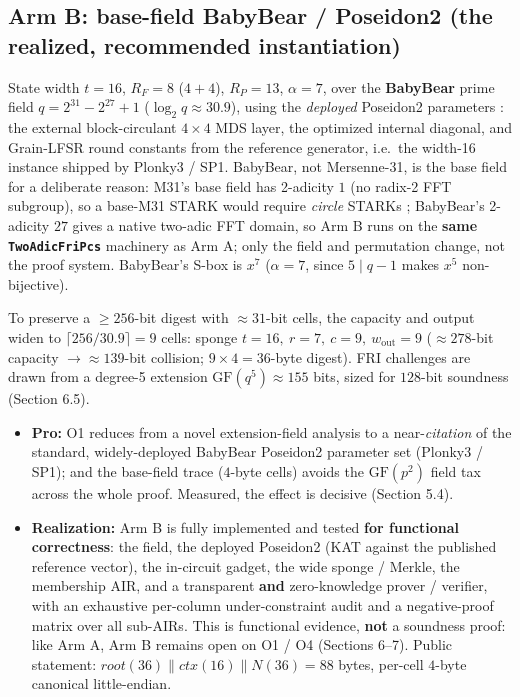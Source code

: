 \documentclass[11pt]{article}
\newcommand{\GF}[1]{\mathrm{GF}(#1)}
\newcommand{\cat}{\mathbin{\|}}          %
\newcommand{\wout}{w_{\mathrm{out}}}
\theoremstyle{plain}
\theoremstyle{definition}
\begin{document}
\subsection{Arm B: base-field BabyBear / Poseidon2 (the realized, recommended instantiation)}

State width $t = 16$, $R_F = 8$ ($4 + 4$), $R_P = 13$, $\alpha = 7$, over the \textbf{BabyBear} prime
field $q = 2^{31} - 2^{27} + 1$ ($\log_2 q \approx 30.9$), using the \emph{deployed} Poseidon2
parameters \cite{GKS23,Plonky3}: the external block-circulant $4 \times 4$ MDS layer, the optimized
internal diagonal, and Grain-LFSR round constants from the reference generator, i.e.\ the width-16
instance shipped by Plonky3 / SP1. BabyBear, not Mersenne-31, is the base field for a deliberate
reason: M31's base field has 2-adicity $1$ (no radix-2 FFT subgroup), so a base-M31 STARK would
require \emph{circle} STARKs \cite{HLP24}; BabyBear's 2-adicity $27$ gives a native two-adic FFT
domain, so Arm B runs on the \textbf{same \texttt{TwoAdicFriPcs}} machinery as Arm A; only the field
and permutation change, not the proof system. BabyBear's S-box is $x^7$ ($\alpha = 7$, since
$5 \mid q-1$ makes $x^5$ non-bijective).

To preserve a $\geq 256$-bit digest with $\approx 31$-bit cells, the capacity and output widen to
$\lceil 256/30.9 \rceil = 9$ cells: sponge $t = 16,\ r = 7,\ c = 9,\ \wout = 9$ ($\approx 278$-bit
capacity $\to \approx 139$-bit collision; $9 \times 4 = 36$-byte digest). FRI challenges are drawn
from a degree-5 extension $\GF{q^5} \approx 155$ bits, sized for $128$-bit soundness (Section 6.5).
\begin{itemize}[leftmargin=*]
\item \textbf{Pro:} O1 reduces from a novel extension-field analysis to a near-\emph{citation} of the
  standard, widely-deployed BabyBear Poseidon2 parameter set (Plonky3 / SP1); and the base-field
  trace ($4$-byte cells) avoids the $\GF{p^2}$ field tax across the whole proof. Measured, the effect
  is decisive (Section 5.4).
\item \textbf{Realization:} Arm B is fully implemented and tested \textbf{for functional correctness}:
  the field, the deployed Poseidon2 (KAT against the published reference vector), the in-circuit
  gadget, the wide sponge / Merkle, the membership AIR, and a transparent \textbf{and} zero-knowledge
  prover / verifier, with an exhaustive per-column under-constraint audit and a negative-proof matrix
  over all sub-AIRs. This is functional evidence, \textbf{not} a soundness proof: like Arm A, Arm B
  remains open on O1 / O4 (Sections 6--7). Public statement:
  $\mathit{root}(36) \cat \mathit{ctx}(16) \cat N(36) = 88$ bytes, per-cell $4$-byte canonical
  little-endian.
\end{itemize}
\end{document}
